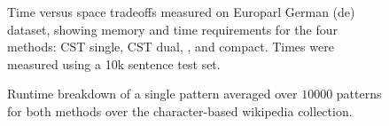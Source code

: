 \begin{figure}[tb]

\caption{Time versus space tradeoffs measured on Europarl German (de) dataset, showing memory and time requirements for the four methods: CST single, CST dual, \SRILM, and \SRILM compact. Times were measured using a 10k sentence test set.}
\label{fig:spacetime}
\end{figure}

\begin{figure}[tb]

\caption{Runtime breakdown of a single pattern averaged over $10000$ patterns for both methods over the character-based wikipedia collection.}
\label{fig:wikitime}
\end{figure}




